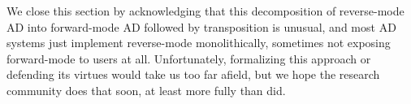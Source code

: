 \documentclass[acmsmall,screen,nonacm]{acmart}
\begin{document}

We close this section by acknowledging that this decomposition of reverse-mode AD into forward-mode AD followed by transposition is unusual, and most AD systems just implement reverse-mode monolithically, sometimes not exposing forward-mode to users at all.
Unfortunately, formalizing this approach or defending its virtues would take us too far afield, but we hope the research community does that soon, at least more fully than \citet{frostig2021decomposing} did.
\end{document}
